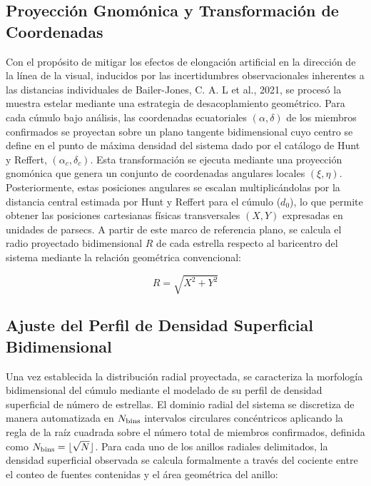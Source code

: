     \subsection{Proyección Gnomónica y Transformación de Coordenadas}
        Con el propósito de mitigar los efectos de elongación artificial en la 
        dirección de la línea de la visual, inducidos por las incertidumbres 
        observacionales inherentes a las distancias individuales de 
        Bailer-Jones, C. A. L et al., 2021, se procesó la muestra estelar 
        mediante una estrategia de desacoplamiento geométrico. Para cada cúmulo 
        bajo análisis, las coordenadas ecuatoriales $(\alpha, \delta)$ de los 
        miembros confirmados se proyectan sobre un plano tangente bidimensional 
        cuyo centro se define en el punto de máxima densidad del sistema dado 
        por el catálogo de Hunt y Reffert, $(\alpha_c, \delta_c)$. Esta 
        transformación se ejecuta mediante una proyección gnomónica que genera 
        un conjunto de coordenadas angulares locales $(\xi, \eta)$. 
        Posteriormente, estas posiciones angulares se escalan multiplicándolas 
        por la distancia central estimada por Hunt y Reffert para el cúmulo 
        ($d_0$), lo que permite obtener las posiciones cartesianas físicas 
        transversales $(X, Y)$ expresadas en unidades de parsecs. A partir de 
        este marco de referencia plano, se calcula el radio proyectado 
        bidimensional $R$ de cada estrella respecto al baricentro del sistema 
        mediante la relación geométrica convencional: 
        
        $$R = \sqrt{X^2 + Y^2}$$

    \subsection{Ajuste del Perfil de Densidad Superficial Bidimensional}
        Una vez establecida la distribución radial proyectada, se caracteriza la 
        morfología bidimensional del cúmulo mediante el modelado de su perfil de 
        densidad superficial de número de estrellas. El dominio radial del 
        sistema se discretiza de manera automatizada en $N_{\rm bins}$ 
        intervalos circulares concéntricos aplicando la regla de la raíz 
        cuadrada sobre el número total de miembros confirmados, definida como 
        $N_{\rm bins} = \lfloor \sqrt{N} \rfloor$. Para cada uno de los anillos 
        radiales delimitados, la densidad superficial observada se calcula 
        formalmente a través del cociente entre el conteo de fuentes contenidas 
        y el área geométrica del anillo: 
        
